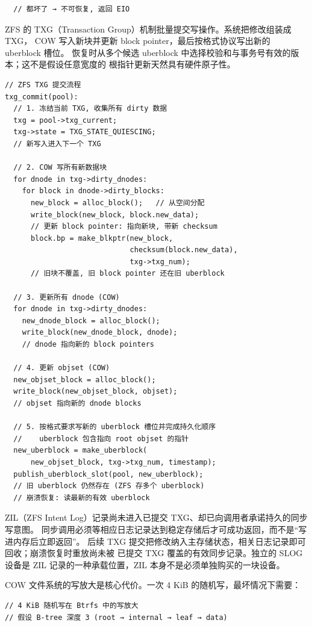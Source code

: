 \begin{filesystemlayout}
\begin{lstlisting}
  // 都坏了 → 不可恢复, 返回 EIO
\end{lstlisting}

ZFS 的 TXG（Transaction Group）机制批量提交写操作。系统把修改组装成 TXG，
COW 写入新块并更新 block pointer，最后按格式协议写出新的 uberblock 槽位。
恢复时从多个候选 uberblock 中选择校验和与事务号有效的版本；这不是假设任意宽度的
根指针更新天然具有硬件原子性。

\begin{lstlisting}
// ZFS TXG 提交流程
txg_commit(pool):
  // 1. 冻结当前 TXG, 收集所有 dirty 数据
  txg = pool->txg_current;
  txg->state = TXG_STATE_QUIESCING;
  // 新写入进入下一个 TXG

  // 2. COW 写所有新数据块
  for dnode in txg->dirty_dnodes:
    for block in dnode->dirty_blocks:
      new_block = alloc_block();   // 从空间分配
      write_block(new_block, block.new_data);
      // 更新 block pointer: 指向新块, 带新 checksum
      block.bp = make_blkptr(new_block,
                             checksum(block.new_data),
                             txg->txg_num);
      // 旧块不覆盖, 旧 block pointer 还在旧 uberblock

  // 3. 更新所有 dnode (COW)
  for dnode in txg->dirty_dnodes:
    new_dnode_block = alloc_block();
    write_block(new_dnode_block, dnode);
    // dnode 指向新的 block pointers

  // 4. 更新 objset (COW)
  new_objset_block = alloc_block();
  write_block(new_objset_block, objset);
  // objset 指向新的 dnode blocks

  // 5. 按格式要求写新的 uberblock 槽位并完成持久化顺序
  //    uberblock 包含指向 root objset 的指针
  new_uberblock = make_uberblock(
      new_objset_block, txg->txg_num, timestamp);
  publish_uberblock_slot(pool, new_uberblock);
  // 旧 uberblock 仍然存在 (ZFS 存多个 uberblock)
  // 崩溃恢复: 读最新的有效 uberblock
\end{lstlisting}

ZIL（ZFS Intent Log）记录尚未进入已提交 TXG、却已向调用者承诺持久的同步写意图。
同步调用必须等相应日志记录达到稳定存储后才可成功返回，而不是“写进内存后立即返回”。
后续 TXG 提交把修改纳入主存储状态，相关日志记录即可回收；崩溃恢复时重放尚未被
已提交 TXG 覆盖的有效同步记录。独立的 SLOG 设备是 ZIL 记录的一种承载位置，ZIL
本身不是必须单独购买的一块设备。


COW 文件系统的写放大是核心代价。一次 4 KiB 的随机写，最坏情况下需要：

\begin{lstlisting}
// 4 KiB 随机写在 Btrfs 中的写放大
// 假设 B-tree 深度 3 (root → internal → leaf → data)


\end{lstlisting}
\end{filesystemlayout}

